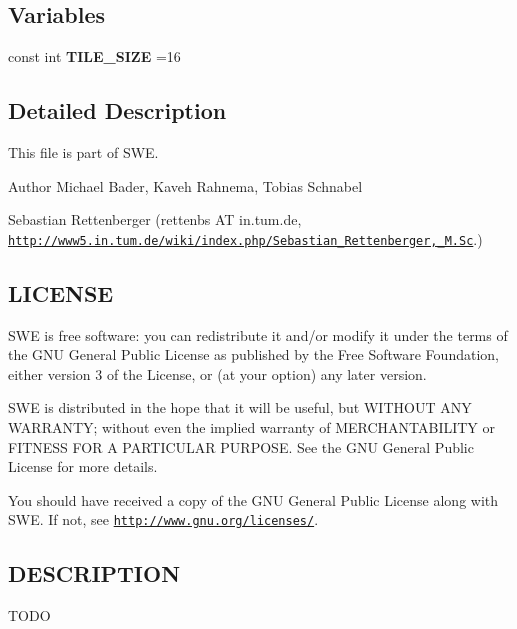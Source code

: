 \subsection*{Variables}
\begin{DoxyCompactItemize}
\item 
\hypertarget{SWE__BlockCUDA_8hh_a8adcd57e318ecb77a2ffe6ec188f005b}{const int {\bfseries T\-I\-L\-E\-\_\-\-S\-I\-Z\-E} =16}\label{SWE__BlockCUDA_8hh_a8adcd57e318ecb77a2ffe6ec188f005b}

\end{DoxyCompactItemize}


\subsection{Detailed Description}
This file is part of S\-W\-E.

\begin{DoxyAuthor}{Author}
Michael Bader, Kaveh Rahnema, Tobias Schnabel 

Sebastian Rettenberger (rettenbs A\-T in.\-tum.\-de, \href{http://www5.in.tum.de/wiki/index.php/Sebastian_Rettenberger,_M.Sc}{\tt http\-://www5.\-in.\-tum.\-de/wiki/index.\-php/\-Sebastian\-\_\-\-Rettenberger,\-\_\-\-M.\-Sc}.)
\end{DoxyAuthor}
\hypertarget{Writer_8hh_LICENSE}{}\subsection{L\-I\-C\-E\-N\-S\-E}\label{Writer_8hh_LICENSE}
S\-W\-E is free software\-: you can redistribute it and/or modify it under the terms of the G\-N\-U General Public License as published by the Free Software Foundation, either version 3 of the License, or (at your option) any later version.

S\-W\-E is distributed in the hope that it will be useful, but W\-I\-T\-H\-O\-U\-T A\-N\-Y W\-A\-R\-R\-A\-N\-T\-Y; without even the implied warranty of M\-E\-R\-C\-H\-A\-N\-T\-A\-B\-I\-L\-I\-T\-Y or F\-I\-T\-N\-E\-S\-S F\-O\-R A P\-A\-R\-T\-I\-C\-U\-L\-A\-R P\-U\-R\-P\-O\-S\-E. See the G\-N\-U General Public License for more details.

You should have received a copy of the G\-N\-U General Public License along with S\-W\-E. If not, see \href{http://www.gnu.org/licenses/}{\tt http\-://www.\-gnu.\-org/licenses/}.\hypertarget{NetCdfWriter_8hh_DESCRIPTION}{}\subsection{D\-E\-S\-C\-R\-I\-P\-T\-I\-O\-N}\label{NetCdfWriter_8hh_DESCRIPTION}
T\-O\-D\-O 

